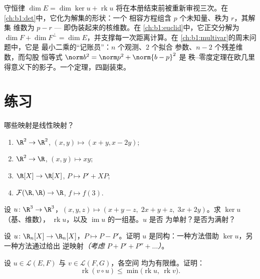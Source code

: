 \begin{remark}
\label{rem:b1:linmaps:perspectives}
守恒律 $\dim E = \dim\ker u + \operatorname{rk} u$
将在本册结束前被重新审视三次。在
\cref{ch:b1:det}中，它化为解集的形状：一个
相容方程组含 $p$ 个未知量、秩为 $r$，其解集
维数为 $p - r$ --- 即伪装起来的核维数。在
\cref{ch:b1:euclid}中，它正交分解为 $\dim F + \dim
F^\perp = \dim E$，并支撑每一次距离计算。在
\cref{ch:b1:multivar}的周末问题中，它是
最小二乘的“记账员”：$n$ 个观测、$2$ 个拟合
参数、$n - 2$ 个残差维数，而勾股
恒等式 $\norm b^2 = \norm p^2 + \norm{b - p}^2$ 是
秩–零度定理在欧几里得意义下的影子。一个定理，四副装束。
\end{remark}

\section{练习}

\begin{exercise}[$\star$]\label{exo:b1:linmaps:1}
哪些映射是线性映射？
\begin{enumerate}
  \item $\R^2 \to \R^2$, $(x, y) \mapsto (x + y, x - 2y)$;
  \item $\R^2 \to \R$, $(x, y) \mapsto xy$;
  \item $\R[X] \to \R[X]$, $P \mapsto P' + XP$;
  \item $\mathcal{F}(\R,\R) \to \R$, $f \mapsto f(3)$.
\end{enumerate}
\end{exercise}

\begin{exercise}[$\star$]\label{exo:b1:linmaps:2}
设 $u \colon \R^3 \to \R^3$，$(x,y,z) \mapsto (x + y - z,\; 2x + y
+ z,\; 3x + 2y)$。求 $\ker u$（基、维数），
$\operatorname{rk} u$，以及 $\operatorname{im} u$ 的一组基。$u$ 是否
为单射？是否为满射？
\end{exercise}

\begin{exercise}[$\star$]\label{exo:b1:linmaps:3}
设 $u \colon \R_n[X] \to \R_n[X]$，$P \mapsto P - P'$。证明
$u$ 是同构：一种方法借助 $\ker u$，另一种方法通过给出
逆映射\emph{（考虑 $P + P' + P'' + \dots$）}。
\end{exercise}

\begin{exercise}[$\star$]\label{exo:b1:linmaps:4}
设 $u \in \mathcal{L}(E, F)$ 与 $v \in \mathcal{L}(F, G)$，各空间
均为有限维。证明：
\[
\operatorname{rk}(v \circ u) \leq
\min\bigl(\operatorname{rk} u,\ \operatorname{rk} v\bigr).
\]
\end{exercise}

